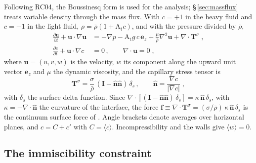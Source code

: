 \documentclass[11pt]{article}
\newcommand{\avg}[1]{\langle #1\rangle}
\newcommand{\At}{\mathrm{A_t}}
\newcommand{\pd}[2]{\frac{\partial #1}{\partial #2}}
\begin{document}
Following RC04, the Boussinesq form is used for the analysis; \S\,\ref{sec:massflux} treats variable density through the mass flux. With $c = +1$ in the heavy fluid and $c = -1$ in the light fluid, $\rho = \bar\rho(1 + \At c)$, and with the pressure divided by $\bar\rho$,
\begin{align}
  \pd{\mathbf u}{t} + \mathbf u \cdot \nabla \mathbf u & = -\nabla p - \At g \, c \, \mathbf e_z + \frac{\mu}{\bar\rho} \nabla^2 \mathbf u + \nabla \cdot \mathbf T^\sigma \;, \label{eq:mom} \\
  \pd{c}{t} + \mathbf u \cdot \nabla c & = 0 \, , \qquad \nabla \cdot \mathbf u = 0 \;, \label{eq:indicator}
\end{align}
where $\mathbf u = (u, v, w)$ is the velocity, $w$ its component along the upward unit vector $\mathbf e_z$ and $\mu$ the dynamic viscosity, and the capillary stress tensor is \citep{Lafaurie1994}
\begin{equation}
  \mathbf T^\sigma = \frac{\sigma}{\bar\rho} \,(\mathbf I - \hat{\mathbf n} \hat{\mathbf n}) \, \delta_s \, , \qquad \hat{\mathbf n} = \frac{\nabla c}{| \nabla c |} \;,
  \label{eq:Tsigma}
\end{equation}
with $\delta_s$ the surface delta function. Since $\nabla \cdot [(\mathbf I - \hat{\mathbf n} \hat{\mathbf n}) \, \delta_s] = \kappa \, \hat{\mathbf n} \, \delta_s$, with $\kappa = -\nabla \cdot \hat{\mathbf n}$ the curvature of the interface, the force $\mathbf f \equiv \nabla \cdot \mathbf T^\sigma = (\sigma/\bar\rho) \, \kappa \, \hat{\mathbf n} \, \delta_s$ is the continuum surface force of \citet{Brackbill1992}. Angle brackets denote averages over horizontal planes, and $c = C + c'$ with $C = \avg c$. Incompressibility and the walls give $\avg w = 0$.

\subsection{The immiscibility constraint}\label{sec:constraint}
\end{document}
